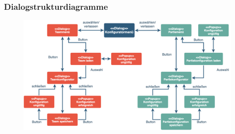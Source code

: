 \subsubsection{Dialogstrukturdiagramme}    
\begin{figure}[H]
    \centering
    \includegraphics[width=\textwidth]{images/dialogstruktur_konfigurator}
\end{figure}

